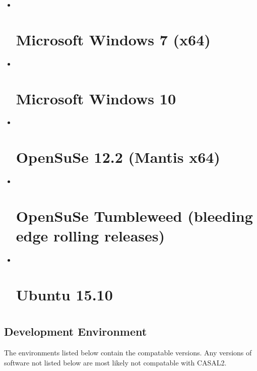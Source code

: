 \documentclass[a4paper,11pt,twoside,pdftex,draft]{article}
\begin{document}
\begin{itemize}
\item ~
  \hypertarget{microsoft-windows-7-x64}{%
  \section{Microsoft Windows 7 (x64)}\label{microsoft-windows-7-x64}}
\item ~
  \hypertarget{microsoft-windows-10}{%
  \section{Microsoft Windows 10}\label{microsoft-windows-10}}
\item ~
  \hypertarget{opensuse-12.2-mantis-x64}{%
  \section{OpenSuSe 12.2 (Mantis x64)}\label{opensuse-12.2-mantis-x64}}
\item ~
  \hypertarget{opensuse-tumbleweed-bleeding-edge-rolling-releases}{%
  \section{OpenSuSe Tumbleweed (bleeding edge rolling
  releases)}\label{opensuse-tumbleweed-bleeding-edge-rolling-releases}}
\item ~
  \hypertarget{ubuntu-15.10}{%
  \section{Ubuntu 15.10}\label{ubuntu-15.10}}
\end{itemize}

\hypertarget{section}{%
\section{}\label{section}}

\hypertarget{development-environment-1}{%
\subsection[Development
Environment]{\texorpdfstring{\protect\hypertarget{anchor-6}{}{}Development
Environment}{Development Environment}}\label{development-environment-1}}

The environments listed below contain the compatable versions. Any
versions of software not listed below are most likely not compatable
with CASAL2.
\end{document}
